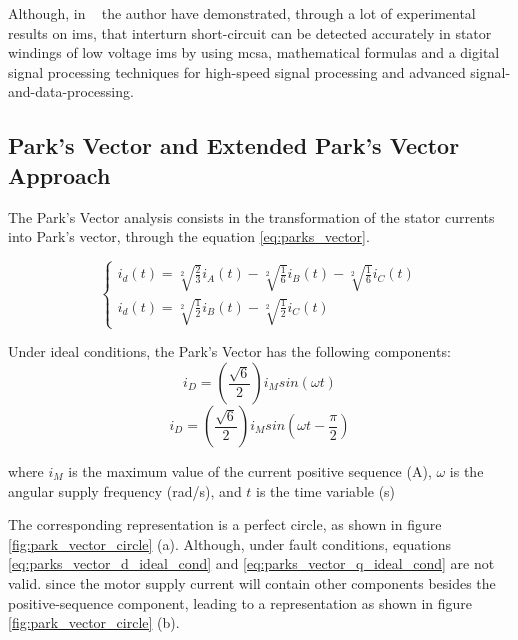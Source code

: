 Although, in ~\cite{Jung2006} the author have demonstrated, through a lot of experimental results on \acrshort{ims}, that interturn short-circuit can be detected accurately in stator windings of low voltage \acrshort{ims} by using \acrshort{mcsa}, mathematical formulas and a digital signal processing techniques for high-speed signal processing and advanced signal-and-data-processing.


\subsection{Park's Vector and Extended Park's Vector Approach} %
\label{subsec:epva}

The Park's Vector analysis consists in the transformation of the stator currents into Park's vector, through the equation \ref{eq:parks_vector}.

\begin{equation} \label{eq:parks_vector}
    \begin{cases}
	    i_{d}(t) =  \sqrt[2]{\frac{2}{3}} i_A(t) - \sqrt[2]{\frac{1}{6}} i_B(t) - \sqrt[2]{\frac{1}{6}} i_C(t) \\
	    i_{d}(t) =  \sqrt[2]{\frac{1}{2}} i_B(t) - \sqrt[2]{\frac{1}{2}} i_C(t) 
	\end{cases}
\end{equation}

 Under ideal conditions, the Park's Vector has the following components:
\begin{equation} \label{eq:parks_vector_d_ideal_cond}
    i_D = (\frac{\sqrt{6}}{2})i_M sin(\omega t)
\end{equation}
\begin{equation} \label{eq:parks_vector_q_ideal_cond}
    i_D = (\frac{\sqrt{6}}{2})i_M sin(\omega t - \frac{\pi}{2})
\end{equation}
 
\noindent where
    $i_M$ is the maximum value of the current positive sequence (A),
    $\omega$ is the angular supply frequency (rad/s),
    and $t$ is the time variable (s)

The corresponding representation is a perfect circle, as shown in figure \ref{fig:park_vector_circle} (a).
Although, under fault conditions, equations \ref{eq:parks_vector_d_ideal_cond} and \ref{eq:parks_vector_q_ideal_cond} are not valid. since the motor supply current will contain other components besides the positive-sequence component, leading to a representation as shown in figure \ref{fig:park_vector_circle} (b).

